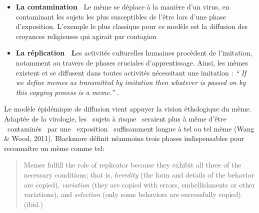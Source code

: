 \begin{itemize}
\item
\textbf{La contamination~\newline
}Le m\`eme se d\'eplace \`a la mani\`ere d{\textquoteright}un virus, en contaminant les sujets les plus susceptibles de l{\textquoteright}\^etre lors d{\textquoteright}une phase d{\textquoteright}exposition. L{\textquoteright}exemple le plus classique pour ce mod\`ele est la diffusion des croyances religieuses
qui agirait par contagion \cite{Dennett2006}
\item
\textbf{La r\'eplication~\newline
L}es activit\'es culturelles humaines proc\`edent de l{\textquoteright}imitation, notamment au travers de phases cruciales d{\textquoteright}apprentissage. Ainsi, les m\`emes existent et se diffusent dans toutes activit\'es n\'ecessitant une imitation : \textit{{\textquotedblleft}} \textit{If we define memes as transmitted by imitation then whatever is passed on by this copying process is a meme.{\textquotedblright} }\cite{Blackmore2006}. 
\end{itemize}

Le mod\`ele \'epid\'emique de diffusion vient appuyer la vision \'ethologique du m\`eme. Adapt\'ee de la virologie, les {\guillemotleft}~sujets \`a risque~{\guillemotright} seraient plus \`a m\^eme d{\textquoteright}\^etre {\guillemotleft}~contamin\'es~{\guillemotright} par une {\guillemotleft}~exposition~{\guillemotright} suffisamment longue \`a tel ou tel m\`eme (Wang \& Wood, 2011). Blackmore d\'efinit n\'eanmoins trois phases indispensables pour reconna\^itre un m\`eme comme tel:  

\begin{quote}
Memes fulfill the role of replicator because they exhibit all three of the necessary conditions; that is, \textit{heredity} (the form and details of the behavior are copied), \textit{variation} (they are copied with errors, embellishments or other variations), and \textit{selection} (only some behaviors are
successfully copied).
(ibid.)
\end{quote}

